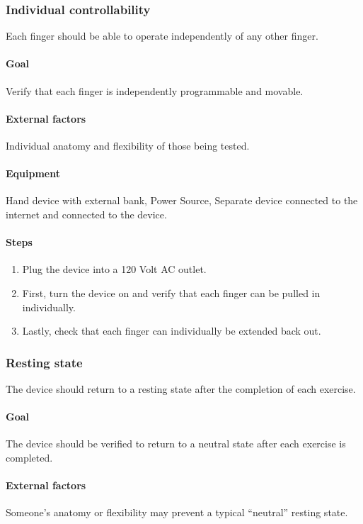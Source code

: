\documentclass{article}
\begin{document}
\subsubsection{Individual controllability}
Each finger should be able to operate independently of any other finger.

\paragraph{Goal} Verify that each finger is independently programmable and movable.

\paragraph{External factors} Individual anatomy and flexibility of those being tested.

\paragraph{Equipment} Hand device with external bank, Power Source, Separate device connected to the internet and connected to the device.

\paragraph{Steps}
\begin{enumerate}
\item Plug the device into a 120 Volt AC outlet.
\item First, turn the device on and verify that each finger can be pulled in individually.
\item Lastly, check that each finger can individually be extended back out.
\end{enumerate}

\subsubsection{Resting state}
The device should return to a resting state after the completion of each exercise.

\paragraph{Goal} The device should be verified to return to a neutral state after each exercise is completed.

\paragraph{External factors} Someone’s anatomy or flexibility may prevent a typical “neutral” resting state.
\end{document}
